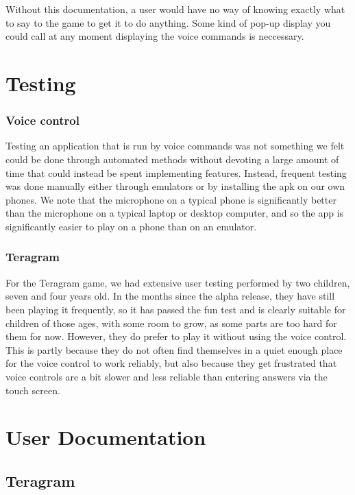 \documentclass[11pt, oneside]{article}
\begin{document}
Without this documentation, a user would have no way of knowing
exactly what to say to the game to get it to do anything. Some kind of
pop-up display you could call at any moment displaying the voice
commands is neccessary.

\section{Testing}

\subsubsection*{Voice control}

Testing an application that is run by voice commands was not something
we felt could be done through automated methods without devoting a
large amount of time that could instead be spent implementing
features. Instead, frequent testing was done manually either through
emulators or by installing the apk on our own phones. We note that the
microphone on a typical phone is significantly better than the
microphone on a typical laptop or desktop computer, and so the app is
significantly easier to play on a phone than on an emulator.


\subsubsection*{Teragram}

For the Teragram game, we had extensive user testing performed by two
children, seven and four years old. In the months since the alpha
release, they have still been playing it frequently, so it has passed
the fun test and is clearly suitable for children of those ages, with
some room to grow, as some parts are too hard for them for
now. However, they do prefer to play it without using the voice
control. This is partly because they do not often find themselves in a
quiet enough place for the voice control to work reliably, but also
because they get frustrated that voice controls are a bit slower and
less reliable than entering answers via the touch screen.

\pagebreak

\section{User Documentation}

\subsection{Teragram}
\end{document}
